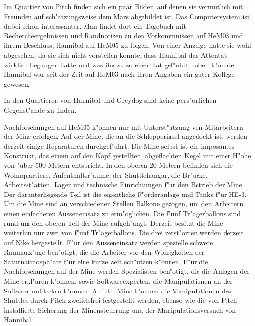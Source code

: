 Im Quartier von Pitch finden sich ein paar Bilder, auf denen sie vermutlich mit Freunden auf sch"atzungsweise dem Mars abgebildet ist. Das Computersystem ist dabei schon interessanter. Man findet dort ein Tagebuch mit Rechercheergebnissen und Randnotizen zu den Vorkommnissen auf HeM03 und ihrem Beschluss, Hannibal auf HeM05 zu folgen. Von einer Anzeige hatte sie wohl abgesehen, da sie sich nicht vorstellen konnte, dass Hannibal das Attentat wirklich begangen hatte und was ihn zu so einer Tat gef"uhrt haben k"onnte. Hannibal war seit der Zeit auf HeM03 nach ihren Angaben ein guter Kollege gewesen.


In den Quartieren von Hannibal und Greydog sind keine pers"onlichen Gegenst"ande zu finden.

Nachforschungen auf HeM05 k"onnen nur mit Unterst"utzung von Mitarbeitern der Mine erfolgen. Auf der Mine, die an die Schlepperinsel angedockt ist, werden derzeit einige Reparaturen durchgef"uhrt. Die Mine selbst ist ein imposantes Konstrukt, das einem auf den Kopf gestellten, abgeflachten Kegel mit einer H"ohe von "uber 500 Metern entspricht. In den oberen 20 Metern befinden sich die Wohnquartiere, Aufenthaltsr"aume, der Shuttlehangar, die Br"ucke, Arbeitsst"atten, Lager und technische Einrichtungen f"ur den Betrieb der Mine. Der darunterliegende Teil ist die eigentliche F"orderanlage und Tanks f"ur HE-3. Um die Mine sind an verschiedenen Stellen Balkone gezogen, um den Arbeitern einen einfacheren Ausseneinsatz zu erm"oglichen. Die f"unf Tr"agerballons sind rund um den oberen Teil der Mine aufgeh"angt. Derzeit besitzt die Mine weiterhin nur zwei von f"unf Tr"agerballons. Die drei zerst"orten werden derzeit auf Nike hergestellt. F"ur den Ausseneinsatz werden spezielle schwere Raumanz"uge ben"otigt, die die Arbeiter vor den Widrigkeiten der Saturnatmosph"are f"ur eine kurze Zeit sch"utzen k"onnen. F"ur die Nachforschungen auf der Mine werden Spezialisten ben"otigt, die die Anlagen der Mine erkl"aren k"onnen, sowie Softwareexperten, die Manipulationen an der Software aufdecken k"onnen. Auf der Mine k"onnen die Manipulationen des Shuttles durch Pitch zweifelsfrei festgestellt werden, ebenso wie die von Pitch installierte Sicherung der Minensteuerung und der Manipulationsversuch von Hannibal.
